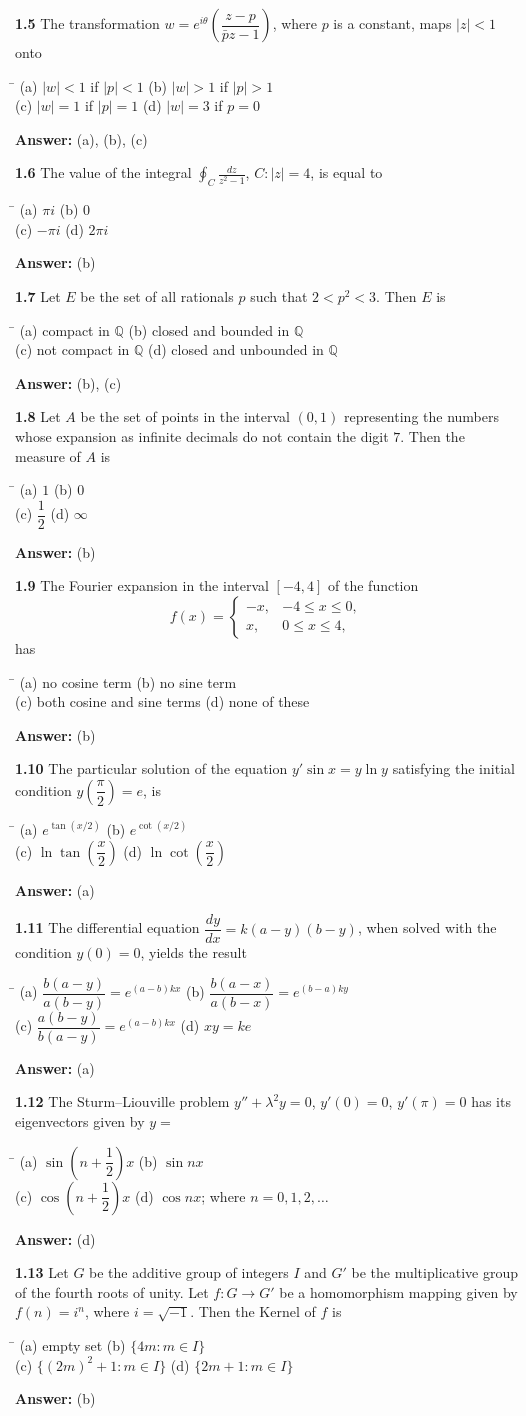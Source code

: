 \documentclass[11pt,a4paper]{article}
\newcommand{\optsfour}[4]{%
  \begin{tabbing}
    \hspace{0.48\linewidth}\=\kill
    (a) #1 \> (b) #2 \\[2pt]
    (c) #3 \> (d) #4
  \end{tabbing}%
}
\newcommand{\ans}[1]{\textbf{Answer:} #1\par\medskip}
\begin{document}
\textbf{1.5} The transformation $w = e^{i\theta}\!\left(\dfrac{z - p}{\bar{p}z - 1}\right)$, where $p$ is a constant, maps $|z| < 1$ onto
\optsfour{$|w| < 1$ if $|p| < 1$}{$|w| > 1$ if $|p| > 1$}{$|w| = 1$ if $|p| = 1$}{$|w| = 3$ if $p = 0$}
\ans{(a), (b), (c)}

\textbf{1.6} The value of the integral $\displaystyle\oint_C \frac{dz}{z^2 - 1}$, $C : |z| = 4$, is equal to
\optsfour{$\pi i$}{$0$}{$-\pi i$}{$2\pi i$}
\ans{(b)}

\textbf{1.7} Let $E$ be the set of all rationals $p$ such that $2 < p^2 < 3$. Then $E$ is
\optsfour{compact in $\mathbb{Q}$}{closed and bounded in $\mathbb{Q}$}{not compact in $\mathbb{Q}$}{closed and unbounded in $\mathbb{Q}$}
\ans{(b), (c)}

\textbf{1.8} Let $A$ be the set of points in the interval $(0,1)$ representing the numbers whose expansion as infinite decimals do not contain the digit $7$. Then the measure of $A$ is
\optsfour{$1$}{$0$}{$\dfrac{1}{2}$}{$\infty$}
\ans{(b)}

\textbf{1.9} The Fourier expansion in the interval $[-4, 4]$ of the function
\[
  f(x) = \begin{cases} -x, & -4 \le x \le 0, \\ x, & 0 \le x \le 4, \end{cases}
\]
has
\optsfour{no cosine term}{no sine term}{both cosine and sine terms}{none of these}
\ans{(b)}

\textbf{1.10} The particular solution of the equation $y'\sin x = y\ln y$ satisfying the initial condition $y\!\left(\dfrac{\pi}{2}\right) = e$, is
\optsfour{$e^{\tan(x/2)}$}{$e^{\cot(x/2)}$}{$\ln\tan\!\left(\dfrac{x}{2}\right)$}{$\ln\cot\!\left(\dfrac{x}{2}\right)$}
\ans{(a)}

\textbf{1.11} The differential equation $\dfrac{dy}{dx} = k(a - y)(b - y)$, when solved with the condition $y(0) = 0$, yields the result
\optsfour{$\dfrac{b(a-y)}{a(b-y)} = e^{(a-b)kx}$}{$\dfrac{b(a-x)}{a(b-x)} = e^{(b-a)ky}$}{$\dfrac{a(b-y)}{b(a-y)} = e^{(a-b)kx}$}{$xy = ke$}
\ans{(a)}

\textbf{1.12} The Sturm--Liouville problem $y'' + \lambda^2 y = 0$, $y'(0) = 0$, $y'(\pi) = 0$ has its eigenvectors given by $y =$
\optsfour{$\sin\!\left(n + \dfrac{1}{2}\right)x$}{$\sin nx$}{$\cos\!\left(n + \dfrac{1}{2}\right)x$}{$\cos nx$; where $n = 0, 1, 2, \dots$}
\ans{(d)}

\textbf{1.13} Let $G$ be the additive group of integers $I$ and $G'$ be the multiplicative group of the fourth roots of unity. Let $f : G \to G'$ be a homomorphism mapping given by $f(n) = i^n$, where $i = \sqrt{-1}$. Then the Kernel of $f$ is
\optsfour{empty set}{$\{4m : m \in I\}$}{$\{(2m)^2 + 1 : m \in I\}$}{$\{2m + 1 : m \in I\}$}
\ans{(b)}
\end{document}
